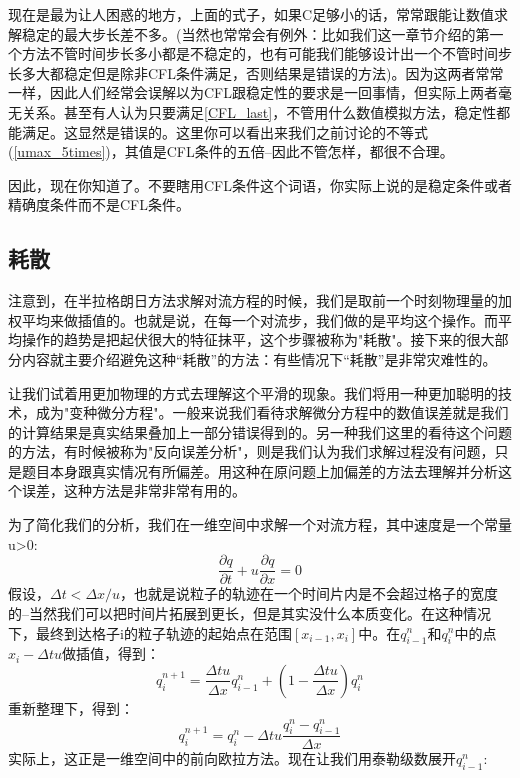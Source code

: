 \documentclass{article}
\begin{document}
现在是最为让人困惑的地方，上面的式子，如果C足够小的话，常常跟能让数值求解稳定的最大步长差不多。(当然也常常会有例外：比如我们这一章节介绍的第一个方法不管时间步长多小都是不稳定的，也有可能我们能够设计出一个不管时间步长多大都稳定但是除非CFL条件满足，否则结果是错误的方法)。因为这两者常常一样，因此人们经常会误解以为CFL跟稳定性的要求是一回事情，但实际上两者毫无关系。甚至有人认为只要满足\ref{CFL_last}，不管用什么数值模拟方法，稳定性都能满足。这显然是错误的。这里你可以看出来我们之前讨论的不等式(\ref{umax_5times})，其值是CFL条件的五倍--因此不管怎样，都很不合理。
\par
因此，现在你知道了。不要瞎用CFL条件这个词语，你实际上说的是稳定条件或者精确度条件而不是CFL条件。
\subsection{耗散}
注意到，在半拉格朗日方法求解对流方程的时候，我们是取前一个时刻物理量的加权平均来做插值的。也就是说，在每一个对流步，我们做的是平均这个操作。而平均操作的趋势是把起伏很大的特征抹平，这个步骤被称为"耗散"。接下来的很大部分内容就主要介绍避免这种“耗散”的方法：有些情况下“耗散”是非常灾难性的。
\par
让我们试着用更加物理的方式去理解这个平滑的现象。我们将用一种更加聪明的技术，成为"变种微分方程"。一般来说我们看待求解微分方程中的数值误差就是我们的计算结果是真实结果叠加上一部分错误得到的。另一种我们这里的看待这个问题的方法，有时候被称为"反向误差分析"，则是我们认为我们求解过程没有问题，只是题目本身跟真实情况有所偏差。用这种在原问题上加偏差的方法去理解并分析这个误差，这种方法是非常非常有用的。
\par
为了简化我们的分析，我们在一维空间中求解一个对流方程，其中速度是一个常量u>0:
\begin{equation}
\frac{\partial{q}}{\partial{t}}+u\frac{\partial{q}}{\partial{x}}=0
\end{equation}
假设，$\Delta{t}<\Delta{x}/u$，也就是说粒子的轨迹在一个时间片内是不会超过格子的宽度的--当然我们可以把时间片拓展到更长，但是其实没什么本质变化。在这种情况下，最终到达格子i的粒子轨迹的起始点在范围$[x_{i-1},x_i]$中。在$q^n_{i-1}$和$q_i^n$中的点$x_i-\Delta{t}u$做插值，得到：
\begin{equation}
q_i^{n+1}=\frac{\Delta{t} u}{\Delta{x}}q^n_{i-1}+(1-\frac{\Delta{t}u}{\Delta{x}})q^n_i
\end{equation}
重新整理下，得到：
\begin{equation}
q_i^{n+1}=q_i^n-\Delta{t}u\frac{q^n_i-q^n_{i-1}}{\Delta{x}} \label{q_n+1}
\end{equation}
实际上，这正是一维空间中的前向欧拉方法。现在让我们用泰勒级数展开$q_{i-1}^n$:
\end{document}
